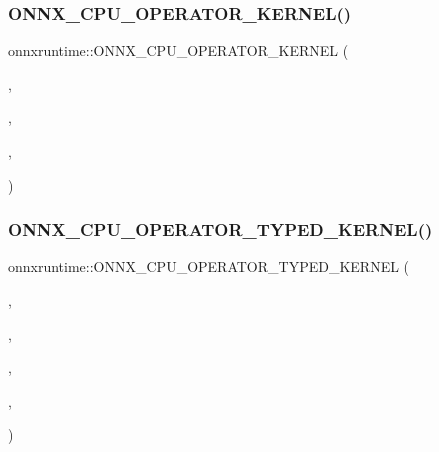 \subsubsection{\texorpdfstring{O\+N\+N\+X\+\_\+\+C\+P\+U\+\_\+\+O\+P\+E\+R\+A\+T\+O\+R\+\_\+\+K\+E\+R\+N\+E\+L()}{ONNX\_CPU\_OPERATOR\_KERNEL()}\hspace{0.1cm}{\footnotesize\ttfamily [71/71]}}
{\footnotesize\ttfamily onnxruntime\+::\+O\+N\+N\+X\+\_\+\+C\+P\+U\+\_\+\+O\+P\+E\+R\+A\+T\+O\+R\+\_\+\+K\+E\+R\+N\+EL (\begin{DoxyParamCaption}\item[{\mbox{\hyperlink{classonnxruntime_1_1Atan}{Atan}}}]{,  }\item[{7}]{,  }\item[{\mbox{\hyperlink{classonnxruntime_1_1KernelDefBuilder}{Kernel\+Def\+Builder}}().Type\+Constraint(\char`\"{}T\char`\"{}, Data\+Type\+Impl\+::\+Get\+Tensor\+Type$<$ float $>$())}]{,  }\item[{\mbox{\hyperlink{classonnxruntime_1_1Atan}{Atan}}$<$ float $>$}]{ }\end{DoxyParamCaption})}

\mbox{\label{namespaceonnxruntime_a090d6b31bfd9b6b3764e30847321acab}} 
\subsubsection{\texorpdfstring{O\+N\+N\+X\+\_\+\+C\+P\+U\+\_\+\+O\+P\+E\+R\+A\+T\+O\+R\+\_\+\+T\+Y\+P\+E\+D\+\_\+\+K\+E\+R\+N\+E\+L()}{ONNX\_CPU\_OPERATOR\_TYPED\_KERNEL()}\hspace{0.1cm}{\footnotesize\ttfamily [1/24]}}
{\footnotesize\ttfamily onnxruntime\+::\+O\+N\+N\+X\+\_\+\+C\+P\+U\+\_\+\+O\+P\+E\+R\+A\+T\+O\+R\+\_\+\+T\+Y\+P\+E\+D\+\_\+\+K\+E\+R\+N\+EL (\begin{DoxyParamCaption}\item[{\mbox{\hyperlink{classonnxruntime_1_1Add}{Add}}}]{,  }\item[{7}]{,  }\item[{float}]{,  }\item[{\mbox{\hyperlink{classonnxruntime_1_1KernelDefBuilder}{Kernel\+Def\+Builder}}().Type\+Constraint(\char`\"{}T\char`\"{}, Data\+Type\+Impl\+::\+Get\+Tensor\+Type$<$ float $>$())}]{,  }\item[{\mbox{\hyperlink{classonnxruntime_1_1Add}{Add}}$<$ float $>$}]{ }\end{DoxyParamCaption})}

